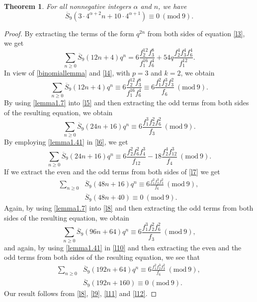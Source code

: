 \documentclass[12pt]{amsart}
\theoremstyle{plain}
\newtheorem{theorem}{Theorem}[section]
\theoremstyle{definition}
\begin{document}
\begin{theorem} For all nonnegative integers $\alpha$ and  $n$, we have
\[
\overline{S}_{9}(3 \cdot 4^{\alpha+2} n + 10 \cdot 4^{\alpha+1} )  \equiv 0 \ (\mathrm{mod} \ 9).
\]
\end{theorem}

\begin{proof} By extracting the terms of the form $q^{2n}$ from both sides of equation \eqref{l3}, we get
\begin{equation}
\sum_{n\geq 0} \overline{S}_{9}(12n+4) q^{n}  = 6\dfrac{f_{2}^{12} f_{3}^{8}}{f_{1}^{16} f_{6}^{4}} +54q \dfrac{f_{2}^{4} f_{3}^{4} f_{6}^{4}}{f_{1}^{12}}. \label{l4}
\end{equation}
In view of \eqref{binomiallemma} and \eqref{l4}, with $p=3$ and $k=2$, we obtain
\begin{equation}
\sum_{n\geq 0} \overline{S}_{9}(12n+4) q^{n}  \equiv 6\dfrac{f_{2}^{12} f_{3}^{8}}{f_{1}^{16} f_{6}^{4}} \equiv 6 \frac{f_{1}^{2} f_{2}^{3} f_{3}^{2}}{f_{6}} \ (\mathrm{mod} \ 9). \label{l5}
\end{equation}
By using \eqref{lemma1.7} into \eqref{l5} and then extracting the odd terms from both sides of the resulting equation, we obtain
\begin{equation}
\sum_{n\geq 0} \overline{S}_{9}(24n+16) q^{n}  \equiv 6 \frac{f_{1}^{3} f_{2}^{2} f_{6}^{2}}{f_{3}} \ (\mathrm{mod} \ 9). \label{l6}
\end{equation}
By employing \eqref{lemma1.41} in \eqref{l6}, we get
\begin{equation}
\sum_{n\geq 0} \overline{S}_{9}(24n+16) q^{n}  \equiv 6 \frac{f_{2}^{2} f_{6}^{2} f_{4}^{3}}{f_{12}} -18 \frac{f_{2}^{4} f_{12}^{3}}{f_{4}} \ (\mathrm{mod} \ 9). \label{l7}
\end{equation}
If we extract the even and the odd terms from both sides of \eqref{l7} we get
\begin{align}
\sum_{n\geq 0} &\overline{S}_{9}(48n+16) q^{n}  \equiv 6\frac{f_{1}^{2} f_{2}^{3} f_{3}^{2}}{f_{6}} \ (\mathrm{mod} \ 9), \label{l8}\\
&\overline{S}_{9}(48n+40)  \equiv 0 \ (\mathrm{mod} \ 9). \label{l9}
\end{align}
Again, by using \eqref{lemma1.7} into \eqref{l8} and then extracting the odd terms from both sides of the resulting equation, we obtain
\begin{equation}
\sum_{n\geq 0} \overline{S}_{9}(96n+64) q^{n}  \equiv 6 \frac{f_{1}^{3} f_{2}^{2} f_{6}^{2}}{f_{3}} \ (\mathrm{mod} \ 9), \label{l10}
\end{equation}
and again, by using \eqref{lemma1.41} in \eqref{l10} and then extracting the even and the odd terms from both sides of the resulting equation, we see that
\begin{align}
\sum_{n\geq 0} &\overline{S}_{9}(192n+64) q^{n}  \equiv 6\frac{f_{1}^{2} f_{2}^{3} f_{3}^{2}}{f_{6}} \ (\mathrm{mod} \ 9), \label{l11}\\
&\overline{S}_{9}(192n+160)  \equiv 0 \ (\mathrm{mod} \ 9). \label{l12}
\end{align}
Our result follows from \eqref{l8}, \eqref{l9}, \eqref{l11} and \eqref{l12}.
\end{proof}
\end{document}
